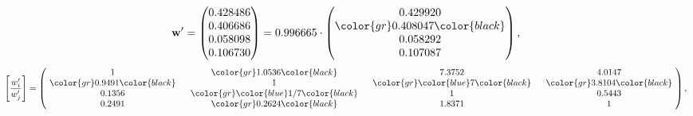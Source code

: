 \begin{example}
\begin{equation*}
\mathbf{w}^{\prime} =
\begin{pmatrix}
0.428486\\
0.406686\\
0.058098\\
0.106730
\end{pmatrix} =
0.996665\cdot
\begin{pmatrix}
0.429920\\
\color{gr} 0.408047\color{black} \\
0.058292\\
0.107087
\end{pmatrix},
\end{equation*}
\begin{equation*}
\left[ \frac{{w}^{\prime}_i}{{w}^{\prime}_j} \right] =
\begin{pmatrix}
$\,\,$ 1 $\,\,$ & $\,\,$\color{gr} 1.0536\color{black} $\,\,$ & $\,\,$7.3752$\,\,$ & $\,\,$4.0147$\,\,$ \\
$\,\,$\color{gr} 0.9491\color{black} $\,\,$ & $\,\,$ 1 $\,\,$ & $\,\,$\color{gr} \color{blue} 7\color{black} $\,\,$ & $\,\,$\color{gr} 3.8104\color{black}   $\,\,$ \\
$\,\,$0.1356$\,\,$ & $\,\,$\color{gr} \color{blue}  1/7\color{black} $\,\,$ & $\,\,$ 1 $\,\,$ & $\,\,$0.5443 $\,\,$ \\
$\,\,$0.2491$\,\,$ & $\,\,$\color{gr} 0.2624\color{black} $\,\,$ & $\,\,$1.8371$\,\,$ & $\,\,$ 1  $\,\,$ \\
\end{pmatrix},
\end{equation*}
\end{example}
\newpage
